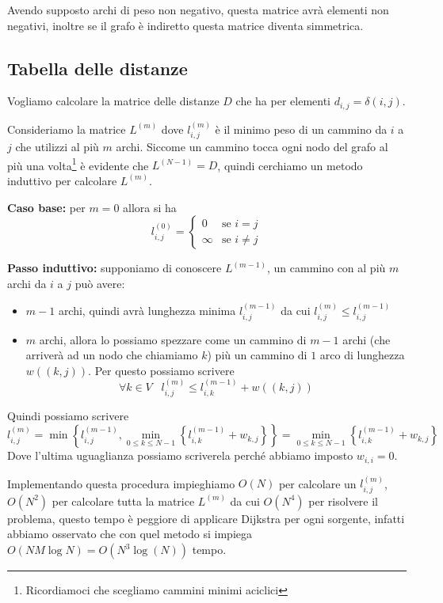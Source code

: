 \documentclass[a4paper,10pt]{amsbook}
\theoremstyle{plain}
\theoremstyle{definition}
\theoremstyle{remark}
\newcommand{\set}[1]{\left\{#1\right\}}
\newcommand{\pa}[1]{\left(#1\right)}
\begin{document}
Avendo supposto archi di peso non negativo, questa matrice avrà
elementi non negativi, inoltre se il grafo è indiretto questa matrice
diventa simmetrica.

\subsection{Tabella delle distanze}

Vogliamo calcolare la matrice delle distanze $D$ che ha per elementi
$d_{i,j} = \delta(i,j)$.

Consideriamo la matrice $L^{(m)}$ dove $l^{(m)}_{i,j}$ è il minimo
peso di un cammino da $i$ a $j$ che utilizzi al più $m$ archi. Siccome
un cammino tocca ogni nodo del grafo al pi\`u una
volta\footnote{Ricordiamoci che scegliamo cammini minimi aciclici} \`e
evidente che $L^{(N-1)} = D$, quindi cerchiamo un metodo induttivo per
calcolare $L^{(m)}$.

\textbf{Caso base:} per $m=0$ allora si ha
\[ l^{(0)} _{i,j} = \left\{
  \begin{matrix}
    0 & \text{se } i = j\\
    \infty & \text{se } i \neq j
  \end{matrix}
  \right.
\]

\textbf{Passo induttivo:} supponiamo di conoscere $L^{(m-1)}$, un
cammino con al più $m$ archi da $i$ a $j$ può avere:
\begin{itemize}
\item $m-1$ archi, quindi avrà lunghezza minima $l^{(m-1)}
  _{i,j}$ da cui $l^{(m)}_{i,j} \le l^{(m-1)} _{i,j}$
\item $m$ archi, allora lo possiamo spezzare come un cammino di
  $m-1$ archi (che arriverà ad un nodo che chiamiamo $k$) più un
  cammino di $1$ arco di lunghezza $w\pa{(k,j)}$. Per questo possiamo
  scrivere 
  \[ \forall k \in V\;\;\; l^{(m)}_{i,j} \le l^{(m-1)} _{i,k} + w\pa{
    (k,j) } \]
\end{itemize}
Quindi possiamo scrivere
\[ l^{(m)}_{i,j} = \min\set{ l^{(m-1)} _{i,j} , \min _{0\le k\le N-1}
  \set{ l^{(m-1)} _{i,k} + w_{k,j}} }  =  \min _{0\le k\le N-1}
  \set{ l^{(m-1)} _{i,k} + w_{k,j}} \]
Dove l'ultima uguaglianza possiamo scriverela perché abbiamo imposto
$w_{i,i} = 0$.

Implementando questa procedura impieghiamo $O(N)$ per calcolare un
$l^{(m)}_{i,j}$, $O(N^2)$ per calcolare tutta la matrice $L^{(m)}$ da
cui $O(N^4)$ per risolvere il problema, questo tempo è peggiore di
applicare Dijkstra per ogni sorgente, infatti abbiamo osservato che
con quel metodo si impiega $O(NM\log N) = O( N^3 \log (N) )$ tempo.
\end{document}
